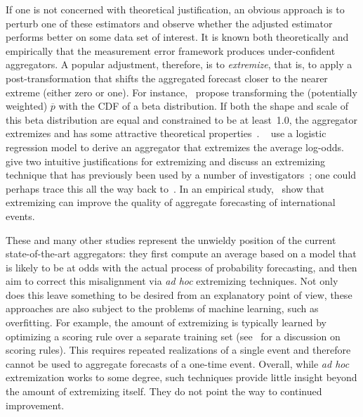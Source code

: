 \documentclass[11pt]{article}
\theoremstyle{definition}
\theoremstyle{definition}
\def\pb{\overline{p}}
\begin{document}
If one is not concerned with theoretical justification, an obvious
approach is to perturb one of these estimators and observe whether the
adjusted estimator performs better on some data set of interest.  It
is known both theoretically and empirically that the measurement error
framework produces under-confident aggregators.  A popular adjustment,
therefore, is to {\em extremize}, that is, to apply a
post-transformation that shifts the aggregated forecast closer to the
nearer extreme (either zero or one).  For instance,~\citet{Ranjan08}
propose transforming the (potentially weighted) $\pb$ with the CDF of a
beta distribution.  If both the shape and scale of this beta
distribution are equal and constrained to be at least~1.0, the
aggregator extremizes and has some attractive theoretical
properties~\citep{Wallsten2001}.  ~\citet{satopaa} use a logistic
regression model to derive an aggregator that extremizes the average
log-odds.  ~\citet{baron2014two} give two intuitive justifications for
extremizing and discuss an extremizing technique that has previously
been used by a number of investigators~\citep{Erev1994,
shlomi2010subjective}; one could perhaps trace this all the way back
to~\citet{karmarkar1978subjectively}.  In an empirical
study,~\citet{mellers2014psychological} show that extremizing can
improve the quality of aggregate forecasting of international events.

These and many other studies represent the unwieldy position of the
 current state-of-the-art aggregators: they first compute an average 
 based on a model that is
likely to be at odds with the actual process of probability
forecasting, and  then aim to correct this misalignment via {\em ad hoc}
extremizing techniques.
%
Not only does this leave something to be desired from an explanatory
point of view, these approaches are also subject to the problems of
machine learning, such as overfitting.  For example, the amount of 
extremizing is typically learned by optimizing a
scoring rule over a separate training set
(see~\citealt{Gneiting04strictlyproper} for a discussion on scoring
rules).  This requires repeated realizations
of a single event and therefore cannot be used to aggregate forecasts
 of a one-time event. Overall, while {\em ad hoc}
extremization works to some degree, such techniques provide little
insight beyond the amount of extremizing itself.  They do not point
the way to continued improvement.
\end{document}
